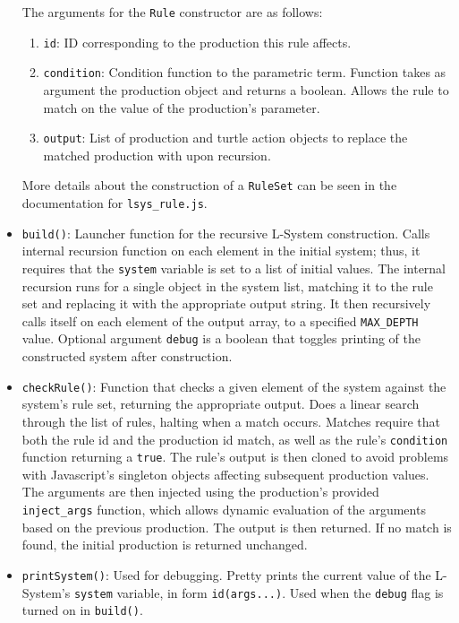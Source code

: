 \documentclass{article}
\begin{document}
\begin{itemize}
\begin{enumerate}
    \end{enumerate}
The arguments for the \verb|Rule| constructor are as follows:
    \begin{enumerate}
        \item \verb|id|: ID corresponding to the production this rule affects.
        \item \verb|condition|: Condition function to the parametric term. Function takes as
    argument the production object and returns a boolean. Allows the rule to match on the
    value of the production's parameter. 
        \item \verb|output|: List of production and turtle action objects to replace the matched
    production with upon recursion. 

    \end{enumerate}
More details about the construction of a \verb|RuleSet| can be seen in the documentation for
\verb|lsys_rule.js|.

    \item \verb|build()|: Launcher function for the recursive L-System construction. Calls internal
recursion function on each element in the initial system; thus, it requires that the \verb|system|
variable is set to a list of initial values. The internal recursion runs for a single object in the
system list, matching it to the rule set and replacing it with the appropriate output string. It
then recursively calls itself on each element of the output array, to a specified \verb|MAX_DEPTH|
value. Optional argument \verb|debug| is a boolean that toggles printing of the constructed system
after construction.

    \item \verb|checkRule()|: Function that checks a given element of the system against the
system's rule set, returning the appropriate output. Does a linear search through the list of
rules, halting when a match occurs. Matches require that both the rule id and the production id
match, as well as the rule's \verb|condition| function returning a \verb|true|. The rule's output
is then cloned to avoid problems with Javascript's singleton objects affecting subsequent
production values. The arguments are then injected using the production's provided
\verb|inject_args| function, which allows dynamic evaluation of the arguments based on the
previous production. The output is then returned. If no match is found, the initial production is
returned unchanged.

    \item \verb|printSystem()|: Used for debugging. Pretty prints the current value of the
L-System's \verb|system| variable, in form \verb|id(args...)|. Used when the \verb|debug| flag is
turned on in \verb|build()|.

\end{itemize}
\end{document}
